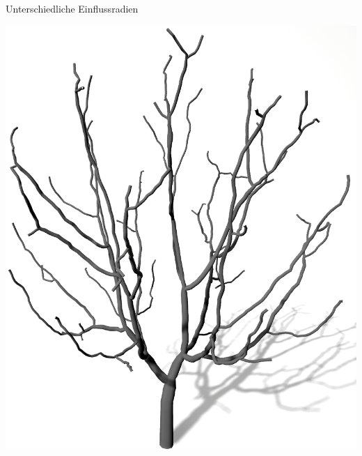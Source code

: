 \begin{center}
\begin{minipage}[c]{0.45\textwidth}
	\end{minipage}
	\vspace{0.05\textheight}
	
	Unterschiedliche Einflussradien
\end{center}





\newpage
\begin{center}
	\vfill
	\begin{minipage}[c]{0.45\textwidth}
		\centering
		\includegraphics[height=.9\textheight]{images/SCA_KDRI_HighKD_LowRI}
	\end{minipage}
	\hspace{.05\textwidth}	
	\begin{minipage}[c]{0.45\textwidth}
		\centering

\end{minipage}
\end{center}
